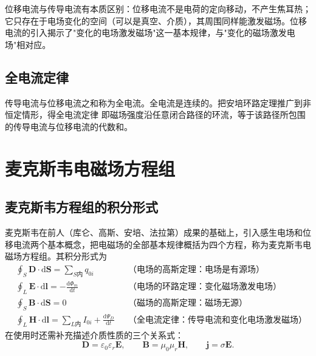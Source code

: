     位移电流与传导电流有本质区别：位移电流不是电荷的定向移动，不产生焦耳热；它只存在于电场变化的空间（可以是真空、介质），其周围同样能激发磁场。位移电流的引入揭示了"变化的电场激发磁场"这一基本规律，与"变化的磁场激发电场"相对应。

    \subsection{全电流定律}
    传导电流与位移电流之和称为全电流。全电流是连续的。把安培环路定理推广到非恒定情形，得全电流定律
    即磁场强度沿任意闭合路径的环流，等于该路径所包围的传导电流与位移电流的代数和。


\section{麦克斯韦电磁场方程组}
    \subsection{麦克斯韦方程组的积分形式}
    麦克斯韦在前人（库仑、高斯、安培、法拉第）成果的基础上，引入感生电场和位移电流两个基本概念，把电磁场的全部基本规律概括为四个方程，称为麦克斯韦电磁场方程组。其积分形式为
    \begin{align*}
    &\oint_S\boldsymbol{D}\cdot\mathrm{d}\boldsymbol{S}=\sum_{S\text{内}}q_{0i}
    &&\text{（电场的高斯定理：电场是有源场）}\\
    &\oint_L\boldsymbol{E}\cdot\mathrm{d}\boldsymbol{l}=-\frac{\mathrm{d}\Phi_m}{\mathrm{d}t}
    &&\text{（电场的环路定理：变化磁场激发电场）}\\
    &\oint_S\boldsymbol{B}\cdot\mathrm{d}\boldsymbol{S}=0
    &&\text{（磁场的高斯定理：磁场无源）}\\
    &\oint_L\boldsymbol{H}\cdot\mathrm{d}\boldsymbol{l}=\sum_{L\text{内}}I_{0i}+\frac{\mathrm{d}\Psi_D}{\mathrm{d}t}
    &&\text{（全电流定律：传导电流和变化电场激发磁场）}
    \end{align*}
    在使用时还需补充描述介质性质的三个关系式：
    \[
    \boldsymbol{D}=\varepsilon_0\varepsilon_r\boldsymbol{E},\qquad
    \boldsymbol{B}=\mu_0\mu_r\boldsymbol{H},\qquad
    \boldsymbol{j}=\sigma\boldsymbol{E}.
    \]

